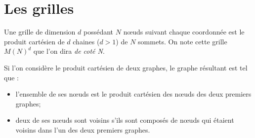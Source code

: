 \section{Les grilles}

\begin{dfn}[Grille]
Une grille de dimension $d$ possédant $N$ nœuds suivant chaque coordonnée est le produit cartésien de $d$ chaines ($d>1$) de $N$ sommets. On note cette grille $M(N)^d$ que l'on dira \textit{de coté N}.
\end{dfn}




\begin{rem}

Si l'on considère le produit cartésien de deux graphes, le graphe résultant est tel que :
\begin{itemize}
\item l'ensemble de ses nœuds est le produit cartésien des nœuds des deux premiers graphes;
\item deux de ses nœuds sont voisins s'ils sont composés de nœuds qui étaient voisins dans l'un des deux premiers graphes.
\end{itemize}

\end{rem}

